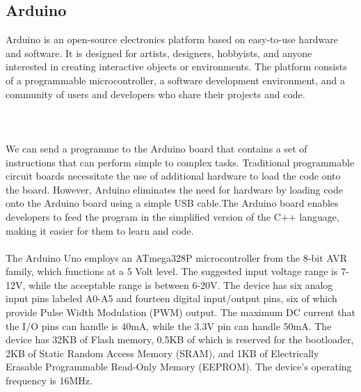 \documentclass[12pt]{article}
\begin{document}
\subsection{Arduino}
Arduino is an open-source electronics platform based on easy-to-use hardware and software. It is designed for artists, designers, hobbyists, and anyone interested in creating interactive objects or environments. The platform consists of a programmable microcontroller, a software development environment, and a community of users and developers who share their projects and code.
\\
\\
\\
\\
We can send a programme to the Arduino board that contains a set of instructions that can perform simple to complex tasks. Traditional programmable circuit boards necessitate the use of additional hardware to load the code onto the board. However, Arduino eliminates the need for hardware by loading code onto the Arduino board using a simple USB cable.The Arduino board enables developers to feed the program in the simplified version of the C++ language, making it easier for them to learn and code. 
\\
\\

The Arduino Uno employs an ATmega328P microcontroller from the 8-bit AVR family, which functions at a 5 Volt level. The suggested input voltage range is 7-12V, while the acceptable range is between 6-20V. The device has six analog input pins labeled A0-A5 and fourteen digital input/output pins, six of which provide Pulse Width Modulation (PWM) output. The maximum DC current that the I/O pins can handle is 40mA, while the 3.3V pin can handle 50mA. The device has 32KB of Flash memory, 0.5KB of which is reserved for the bootloader, 2KB of Static Random Access Memory (SRAM), and 1KB of Electrically Erasable Programmable Read-Only Memory (EEPROM). The device's operating frequency is 16MHz.
\\
\\
\\
\end{document}
